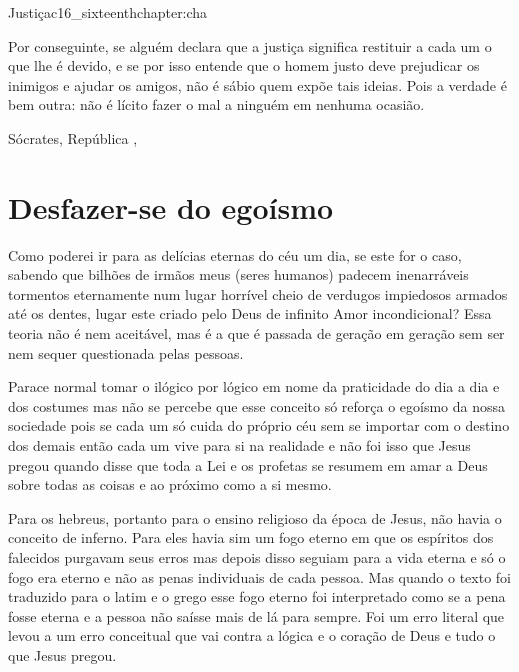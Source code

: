 \begin{chapterpage}{Justiça}{c16_sixteenthchapter:cha}

\begin{myquotation}Por conseguinte, se alguém declara que a justiça significa restituir a cada um o que lhe é devido, e se por isso entende que o homem justo deve prejudicar os inimigos e ajudar os amigos, não é sábio quem expõe tais ideias. Pois a verdade é bem outra: não é lícito fazer o mal a ninguém em nenhuma ocasião.
 
\par\vspace*{15mm}
\mbox{}\hfill \emdash{}Sócrates, República 
, %
\par\end{myquotation}

\end{chapterpage}



\section{Desfazer-se do egoísmo}\label{c1_basicformatting:sec}

\emdash{}Como poderei ir para as delícias eternas do céu um dia, se este for o caso, sabendo que bilhões de irmãos meus (seres humanos) padecem inenarráveis tormentos eternamente num lugar horrível cheio de verdugos impiedosos armados até os dentes, lugar este criado pelo Deus de infinito Amor incondicional? Essa teoria não é nem aceitável, mas é a que é passada de geração em geração sem ser nem sequer questionada pelas pessoas.

\emdash{}Parace normal tomar o ilógico por lógico em nome da praticidade do dia a dia e dos costumes mas não se percebe que esse conceito só reforça o egoísmo da nossa sociedade pois se cada um só cuida do próprio céu sem se importar com o destino dos demais então cada um vive para si na realidade e não foi isso que Jesus pregou quando disse que toda a Lei e os profetas se resumem em amar a Deus sobre todas as coisas e ao próximo como a si mesmo.

\emdash{}Para os hebreus, portanto para o ensino religioso da época de Jesus, não havia o conceito de inferno. Para eles havia sim um fogo eterno em que os espíritos dos falecidos purgavam seus erros mas depois disso seguiam para a vida eterna e só o fogo era eterno e não as penas individuais de cada pessoa. Mas quando o texto foi traduzido para o latim e o grego esse fogo eterno foi interpretado como se a pena fosse eterna e a pessoa não saísse mais de lá para sempre. Foi um erro literal que levou a um erro conceitual que vai contra a lógica e o coração de Deus e tudo o que Jesus pregou.

